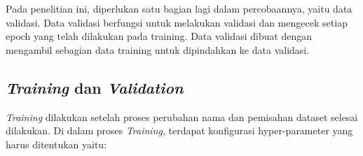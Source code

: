 

Pada penelitian ini, diperlukan satu bagian lagi dalam percobaannya, yaitu data validasi. Data validasi 
berfungsi untuk melakukan validasi dan mengecek setiap epoch yang telah dilakukan pada training. Data 
validasi dibuat dengan mengambil sebagian data training untuk dipindahkan ke data validasi.



\subsection{\emph{Training} dan \emph{Validation}}

\emph{Training} dilakukan setelah proses perubahan nama dan pemisahan dataset selesai dilakukan. Di dalam 
proses \emph{Training}, terdapat konfigurasi hyper-parameter yang harus ditentukan yaitu:

